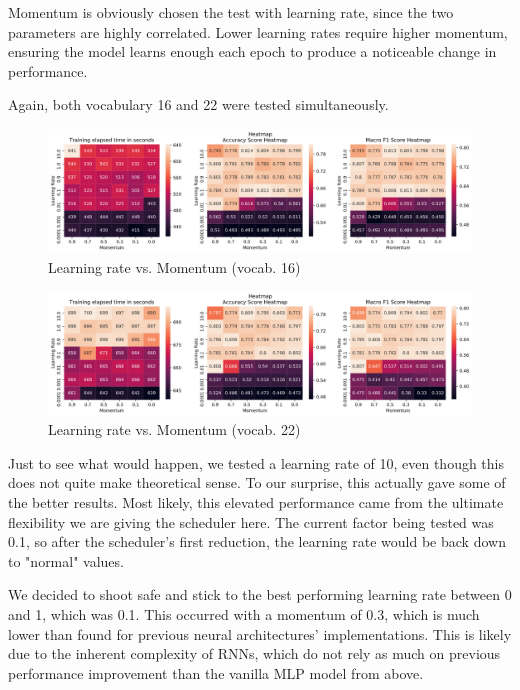 Momentum is obviously chosen the test with learning rate, since the two parameters are highly correlated. Lower learning rates require higher momentum, ensuring the model learns enough each epoch to produce a noticeable change in performance. 

Again, both vocabulary 16 and 22 were tested simultaneously.

\begin{figure}[H]
    \centering
    \includegraphics[width=1\linewidth]{pictures/ex6_heatmap_16_LrMmt.png}
    \caption{Learning rate vs. Momentum (vocab. 16)}
    \label{fig:lrm_16_rnn}
\end{figure}

\begin{figure}[H]
    \centering
    \includegraphics[width=1\linewidth]{pictures/ex6_heatmap_22_LrMmt.png}
    \caption{Learning rate vs. Momentum (vocab. 22)}
    \label{fig:lrm_22_rnn}
\end{figure}

Just to see what would happen, we tested a learning rate of 10, even though this does not quite make theoretical sense. To our surprise, this actually gave some of the better results. Most likely, this elevated performance came from the ultimate flexibility we are giving the scheduler here. The current factor being tested was 0.1, so after the scheduler's first reduction, the learning rate would be back down to "normal" values.  

We decided to shoot safe and stick to the best performing learning rate between 0 and 1, which was 0.1. This occurred with a momentum of 0.3, which is much lower than found for previous neural architectures' implementations. This is likely due to the inherent complexity of RNNs, which do not rely as much on previous performance improvement than the vanilla MLP model from above.

